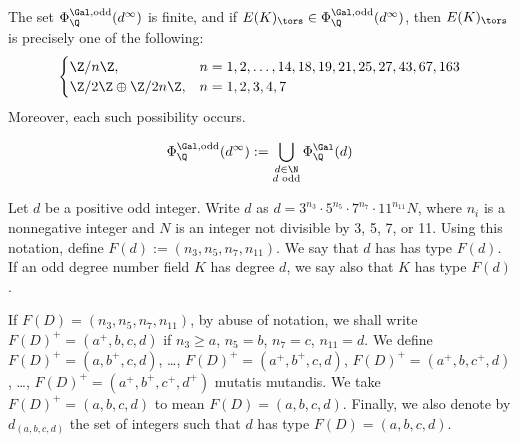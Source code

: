 \begin{frame}[plain]
\begin{thm}
The set $\Phi_\Q^{\Gal,\text{odd}}(d^\infty)$ is finite, and if $E(K)_\tors \in \Phi_\Q^{\Gal,\text{odd}}(d^\infty)$, then $E(K)_\tors$ is precisely one of the following:
	\[
	\begin{cases}
	\Z/n\Z, & n= 1, 2, \ldots, 14, 18, 19, 21, 25, 27, 43, 67, 163 \\
	\Z/2\Z \oplus \Z/2n\Z, & n= 1, 2, 3, 4, 7
	\end{cases}
	\]
Moreover, each such possibility occurs. 
\end{thm}
	\[
	\Phi_\Q^{\Gal,\text{odd}}(d^\infty):= \bigcup_{\substack{d \in \N \\ d \text{ odd}}} \Phi_\Q^{\Gal}(d)
	\]
\end{frame}





\begin{frame}[plain]
\footnotesize
\begin{dfn}
Let $d$ be a positive odd integer. Write $d$ as $d= 3^{n_3} \cdot 5^{n_5} \cdot 7^{n_7} \cdot 11^{n_{11}}N$, where $n_i$ is a nonnegative integer and $N$ is an integer not divisible by 3, 5, 7, or 11. Using this notation, define $F(d):= (n_3, n_5, n_7, n_{11})$. We say that $d$ has has type $F(d)$. If an odd degree number field $K$ has degree $d$, we say also that $K$ has type $F(d)$. \pspace

If $F(D)= (n_3, n_5, n_7, n_{11})$, by abuse of notation, we shall write $F(D)^+= (a^+,b,c,d)$ if $n_3 \geq a$, $n_5= b$, $n_7= c$, $n_{11}= d$. We define $F(D)^+= (a,b^+,c,d)$, \dots, $F(D)^+= (a^+,b^+,c,d)$, $F(D)^+= (a^+,b,c^+,d)$, \dots, $F(D)^+= (a^+,b^+,c^+,d^+)$ mutatis mutandis. We take $F(D)^+= (a,b,c,d)$ to mean $F(D)= (a,b,c,d)$. Finally, we also denote by $d_{(a,b,c,d)}$ the set of integers such that $d$ has type $F(D)= (a,b,c,d)$. 
\end{dfn}
\end{frame}





